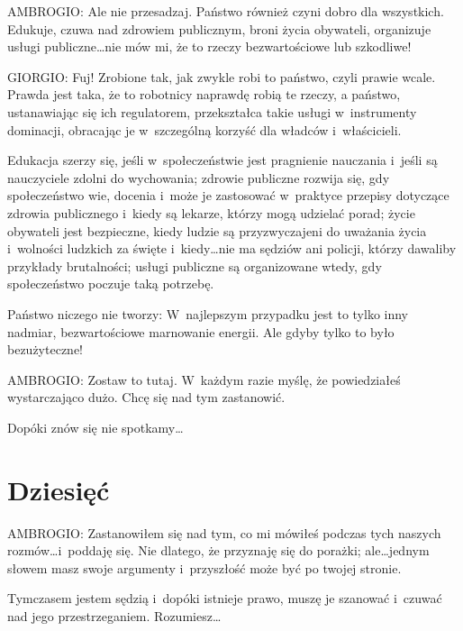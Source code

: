 \documentclass[oneside,polish,11pt,sfheadings]{mwbk}
\begin{document}
 
\noindent AMBROGIO: Ale nie przesadzaj. Państwo również czyni dobro dla wszystkich. Edukuje, czuwa nad zdrowiem publicznym, broni
życia obywateli, organizuje usługi publiczne\ldots nie mów mi, że to rzeczy bezwartościowe lub szkodliwe! 




 
\noindent GIORGIO: Fuj! Zrobione tak, jak zwykle robi to państwo, czyli prawie wcale. Prawda jest taka, że to robotnicy naprawdę
robią te rzeczy, a państwo, ustanawiając się ich regulatorem, przekształca takie usługi w~instrumenty dominacji,
obracając je w~szczególną korzyść dla władców i~właścicieli. 

 
Edukacja szerzy się, jeśli w~społeczeństwie jest pragnienie nauczania i~jeśli są nauczyciele zdolni do wychowania;
zdrowie publiczne rozwija się, gdy społeczeństwo wie, docenia i~może je zastosować w~praktyce przepisy dotyczące
zdrowia publicznego i~kiedy są lekarze, którzy mogą udzielać porad; życie obywateli jest bezpieczne, kiedy ludzie są
przyzwyczajeni do uważania życia i~wolności ludzkich za święte i~kiedy\ldots nie ma sędziów ani policji, którzy dawaliby
przykłady brutalności; usługi publiczne są organizowane wtedy, gdy społeczeństwo poczuje taką potrzebę. 

 
Państwo niczego nie tworzy: W~najlepszym przypadku jest to tylko inny nadmiar, bezwartościowe marnowanie energii. Ale
gdyby tylko to było bezużyteczne! 




 
\noindent AMBROGIO: Zostaw to tutaj. W~każdym razie myślę, że powiedziałeś wystarczająco dużo. Chcę się nad tym zastanowić. 

 
Dopóki znów się nie spotkamy\ldots 










\chapter*{Dziesięć}



 
\noindent AMBROGIO: Zastanowiłem się nad tym, co mi mówiłeś podczas tych naszych rozmów\ldots i~poddaję się. Nie dlatego, że
przyznaję się do porażki; ale\ldots jednym słowem masz swoje argumenty i~przyszłość może być po twojej stronie. 

 
Tymczasem jestem sędzią i~dopóki istnieje prawo, muszę je szanować i~czuwać nad jego przestrzeganiem. Rozumiesz\ldots 
\end{document}
